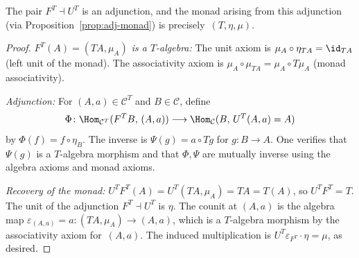 \begin{proposition}\label{prop:em-adjunction}
The pair $F^T\dashv U^T$ is an adjunction, and the monad arising
from this adjunction (via Proposition~\ref{prop:adj-monad}) is
precisely~$(T,\eta,\mu)$.
\end{proposition}

\begin{proof}
\textit{$F^T(A) = (TA,\mu_A)$ is a $T$-algebra:}
The unit axiom is $\mu_A\circ\eta_{TA} = \id_{TA}$ (left unit of the
monad).  The associativity axiom is $\mu_A\circ\mu_{TA} = \mu_A\circ T\mu_A$
(monad associativity).

\textit{Adjunction:} For $(A,a)\in\mathcal{C}^T$ and $B\in\mathcal{C}$,
define
\[
    \Phi\colon\Hom_{\mathcal{C}^T}(F^TB,\,(A,a))
    \longrightarrow \Hom_{\mathcal{C}}(B,\,U^T(A,a) = A)
\]
by $\Phi(f) = f\circ\eta_B$.  The inverse is
$\Psi(g) = a\circ Tg$ for $g\colon B\to A$.
One verifies that $\Psi(g)$ is a $T$-algebra morphism and that
$\Phi,\Psi$ are mutually inverse using the algebra axioms and monad axioms.

\textit{Recovery of the monad:}
$U^TF^T(A) = U^T(TA,\mu_A) = TA = T(A)$, so $U^TF^T = T$.
The unit of the adjunction $F^T\dashv U^T$ is $\eta$.
The counit at $(A,a)$ is the algebra map
$\varepsilon_{(A,a)} = a\colon(T A,\mu_A)\to(A,a)$,
which is a $T$-algebra morphism by the associativity axiom for~$(A,a)$.
The induced multiplication is $U^T\varepsilon_{F^T}\cdot\eta = \mu$,
as desired.
\end{proof}

